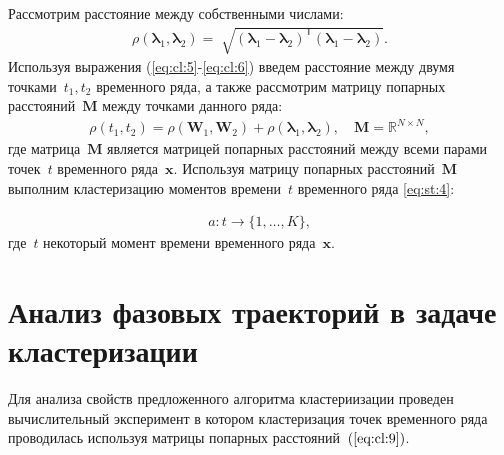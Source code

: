 Рассмотрим расстояние между собственными числами:
\[
\label{eq:cl:6}
\begin{aligned}
\rho\left(\bm{\lambda}_1, \bm{\lambda}_2\right) = \sqrt[]{\left(\bm{\lambda}_1 - \bm{\lambda}_2\right)^{\mathsf{T}}\left(\bm{\lambda}_1 - \bm{\lambda}_2\right)}.
\end{aligned}
\]
Используя выражения (\ref{eq:cl:5}-\ref{eq:cl:6}) введем расстояние между двумя точками~$t_1, t_2$ временного ряда, а также рассмотрим матрицу попарных расстояний~$\textbf{M}$ между точками данного ряда:
\[
\label{eq:cl:9}
\begin{aligned}
\rho\left(t_1, t_2\right) = \rho\left(\textbf{W}_1, \textbf{W}_2\right) + \rho\left(\bm{\lambda}_1, \bm{\lambda}_2\right), \quad \textbf{M} =  \mathbb{R}^{N\times N},
\end{aligned}
\]
где %
матрица~$\textbf{M}$ является матрицей попарных расстояний между всеми парами точек~$t$ временного ряда~$\textbf{x}$.
Используя матрицу попарных расстояний~$\textbf{M}$ выполним кластеризацию моментов времени~$t$ временного ряда \eqref{eq:st:4}:

\[
\label{eq:cl:10}
\begin{aligned}
a : t \to \{1,\ldots, K\}, 
\end{aligned}
\]
где~$t$ некоторый момент времени временного ряда~$\textbf{x}$.

\section{Анализ фазовых траекторий в задаче кластеризации}
Для анализа свойств предложенного алгоритма кластериизации проведен вычислительный эксперимент в котором кластеризация точек временного ряда проводилась используя матрицы попарных расстояний~$(\ref{eq:cl:9})$.

